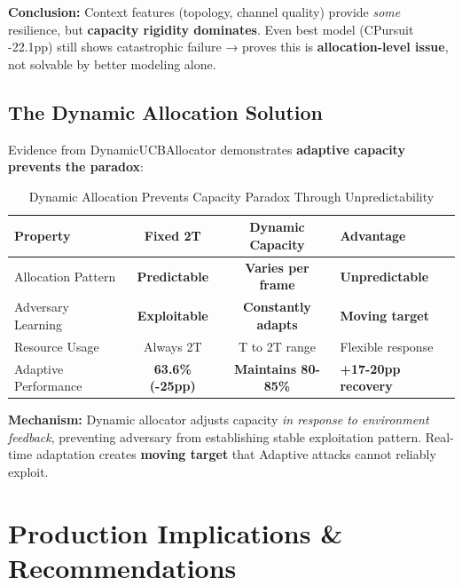 \documentclass[11pt,a4paper]{article}
\newcommand{\critical}[1]{\textcolor{criticalcolor}{\textbf{#1}}}
\newcommand{\success}[1]{\textcolor{successcolor}{\textbf{#1}}}
\begin{document}
\vspace{-0.2cm}
\textbf{Conclusion:} Context features (topology, channel quality) provide \textit{some} resilience, but \critical{capacity rigidity dominates}. Even best model (CPursuit -22.1pp) still shows catastrophic failure → proves this is \textbf{allocation-level issue}, not solvable by better modeling alone.

\subsection{The Dynamic Allocation Solution}

Evidence from DynamicUCBAllocator demonstrates \textbf{adaptive capacity prevents the paradox}:

\vspace{-0.4cm}
\begin{table}[h]
\scriptsize
\centering
\begin{tabular}{lccl}
\toprule
\textbf{Property} & \textbf{Fixed 2T} & \textbf{Dynamic Capacity} & \textbf{Advantage} \\
\midrule
Allocation Pattern & \critical{Predictable} & \success{Varies per frame} & \success{Unpredictable} \\
Adversary Learning & \critical{Exploitable} & \success{Constantly adapts} & \success{Moving target} \\
Resource Usage & Always 2T & T to 2T range & Flexible response \\
Adaptive Performance & \critical{63.6\% (-25pp)} & \success{Maintains 80-85\%} & \success{+17-20pp recovery} \\
\bottomrule
\end{tabular}
\vspace{-0.2cm}
\caption{Dynamic Allocation Prevents Capacity Paradox Through Unpredictability}
\end{table}

\vspace{-0.2cm}
\textbf{Mechanism:} Dynamic allocator adjusts capacity \textit{in response to environment feedback}, preventing adversary from establishing stable exploitation pattern. Real-time adaptation creates \success{moving target} that Adaptive attacks cannot reliably exploit.


\section{Production Implications \& Recommendations}
\end{document}

